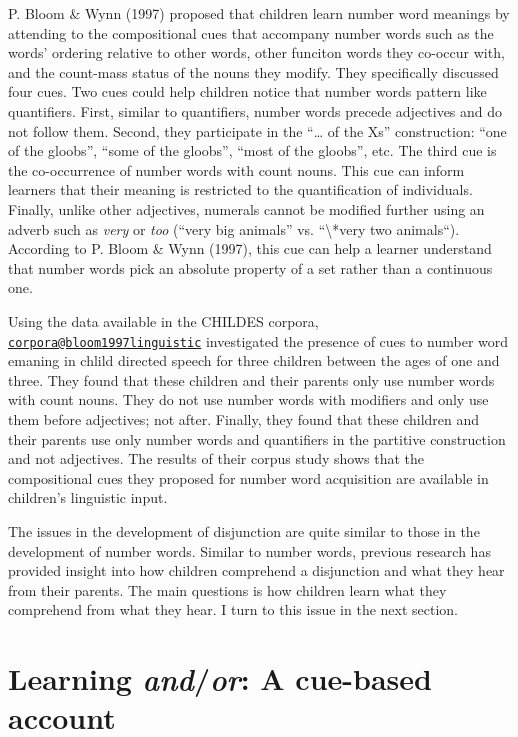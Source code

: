 \documentclass[oneside]{report}
\theoremstyle{definition}
\theoremstyle{definition}
\theoremstyle{definition}
\theoremstyle{remark}
\begin{document}
P. Bloom \& Wynn (1997) proposed that children learn number word
meanings by attending to the compositional cues that accompany number
words such as the words' ordering relative to other words, other
funciton words they co-occur with, and the count-mass status of the
nouns they modify. They specifically discussed four cues. Two cues could
help children notice that number words pattern like quantifiers. First,
similar to quantifiers, number words precede adjectives and do not
follow them. Second, they participate in the ``\ldots{} of the Xs''
construction: ``one of the gloobs'', ``some of the gloobs'', ``most of
the gloobs'', etc. The third cue is the co-occurrence of number words
with count nouns. This cue can inform learners that their meaning is
restricted to the quantification of individuals. Finally, unlike other
adjectives, numerals cannot be modified further using an adverb such as
\emph{very} or \emph{too} (``very big animals'' vs.
``\textbackslash{}*very two animals``). According to P. Bloom \& Wynn
(1997), this cue can help a learner understand that number words pick an
absolute property of a set rather than a continuous one.

Using the data available in the CHILDES corpora,
\href{mailto:corpora@bloom1997linguistic}{\nolinkurl{corpora@bloom1997linguistic}}
investigated the presence of cues to number word emaning in chlild
directed speech for three children between the ages of one and three.
They found that these children and their parents only use number words
with count nouns. They do not use number words with modifiers and only
use them before adjectives; not after. Finally, they found that these
children and their parents use only number words and quantifiers in the
partitive construction and not adjectives. The results of their corpus
study shows that the compositional cues they proposed for number word
acquisition are available in children's linguistic input.

The issues in the development of disjunction are quite similar to those
in the development of number words. Similar to number words, previous
research has provided insight into how children comprehend a disjunction
and what they hear from their parents. The main questions is how
children learn what they comprehend from what they hear. I turn to this
issue in the next section.

\section{\texorpdfstring{Learning \emph{and}/\emph{or}: A cue-based
account}{Learning and/or: A cue-based account}}\label{myaccount}
\end{document}
